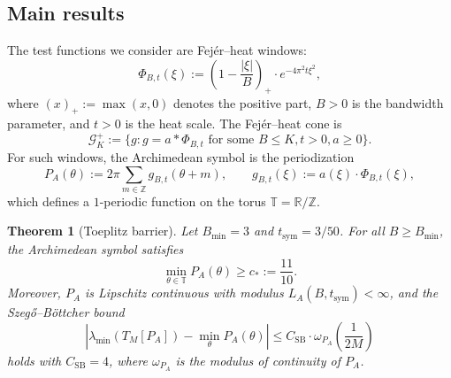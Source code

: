 \documentclass[11pt,a4paper]{article}
\newtheorem{theorem}{Theorem}[section]
\theoremstyle{definition}
\theoremstyle{remark}
\newcommand{\R}{\mathbb{R}}
\newcommand{\Z}{\mathbb{Z}}
\newcommand{\T}{\mathbb{T}}
\begin{document}
\subsection{Main results}

The test functions we consider are Fej\'er--heat windows:
\begin{equation}\label{eq:Phi-def}
  \Phi_{B,t}(\xi) := \left(1 - \frac{|\xi|}{B}\right)_+ \cdot e^{-4\pi^2 t \xi^2},
\end{equation}
where $(x)_+ := \max(x, 0)$ denotes the positive part, $B > 0$ is the bandwidth parameter, and $t > 0$ is the heat scale. The Fej\'er--heat cone is
\[
  \mathcal{G}_K^+ := \{g : g = a * \Phi_{B,t} \text{ for some } B \leq K, t > 0, a \geq 0\}.
\]
For such windows, the Archimedean symbol is the periodization
\begin{equation}\label{eq:PA-def}
  P_A(\theta) := 2\pi \sum_{m \in \Z} g_{B,t}(\theta + m), \qquad
  g_{B,t}(\xi) := a(\xi) \cdot \Phi_{B,t}(\xi),
\end{equation}
which defines a $1$-periodic function on the torus $\T = \R/\Z$.

\begin{theorem}[Toeplitz barrier]\label{thm:toeplitz-barrier}
Let $B_{\min} = 3$ and $t_{\mathrm{sym}} = 3/50$. For all $B \geq B_{\min}$, the Archimedean symbol satisfies
\begin{equation}\label{eq:floor}
  \min_{\theta \in \T} P_A(\theta) \geq c_* := \frac{11}{10}.
\end{equation}
Moreover, $P_A$ is Lipschitz continuous with modulus $L_A(B, t_{\mathrm{sym}}) < \infty$, and the Szeg\H{o}--B\"ottcher bound
\begin{equation}\label{eq:SB}
  \left| \lambda_{\min}(T_M[P_A]) - \min_\theta P_A(\theta) \right|
  \leq C_{\mathrm{SB}} \cdot \omega_{P_A}\left(\frac{1}{2M}\right)
\end{equation}
holds with $C_{\mathrm{SB}} = 4$, where $\omega_{P_A}$ is the modulus of continuity of $P_A$.
\end{theorem}
\end{document}
